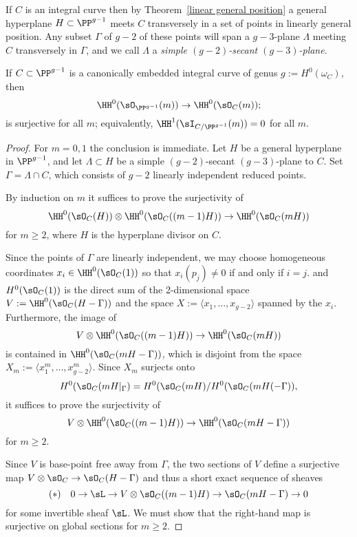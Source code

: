 If $C$ is an integral curve then by Theorem~\ref{linear general position} a general hyperplane $H\subset \PP^{g-1}$
meets $C$ transversely in a set of points in linearly general position. Any subset $\Gamma$ of $g-2$ of these points will span a $g-3$-plane $\Lambda$
meeting $C$ transversely in $\Gamma$, and we call $\Lambda$ a \emph{simple $(g-2)$-secant $(g-3)$-plane}. 

\begin{theorem}\label{canonical curves are ACM}
If $C\subset \PP^{g-1}$ is a  canonically embedded integral curve of genus $g := H^0(\omega_C)$, then 
$$
\HH^{0}(\sO_{\PP^{g-1}}(m)) \to \HH^{0}(\sO_{C}(m));
$$
is  surjective for all $m$; equivalently,
$\HH^{1}(\sI_{C/\PP^{g-1}}(m)) = 0$ for all $m$.
\end{theorem}
  
\begin{proof} 

For $m = 0,1$ the conclusion is immediate. Let $H$ be a general hyperplane in $\PP^{g-1}$, 
and let $\Lambda \subset H$ be a simple $(g-2)$-secant $(g-3)$-plane to $C$. Set $\Gamma = \Lambda \cap C$,
which consists of $g-2$ linearly independent reduced points.

By induction on $m$ it suffices to prove the surjectivity of
$$
\HH^{0}(\sO_{C}(H)) \otimes \HH^{0}(\sO_{C}((m-1)H)) \to \HH^{0}(\sO_{C}(mH))
$$
for $m\geq 2$, where $H$ is the hyperplane divisor on $C$.

Since the points of $\Gamma$
are linearly independent, we may choose homogeneous coordinates $x_{i} \in \HH^{0}(\sO_{C}(1))$ so that
$x_{i}(p_{j}) \neq 0$ if and only if $i = j$. 
and $H^0(\sO_C(1))$ is the direct sum of the 2-dimensional
space $V:= \HH^{0}(\sO_{C}(H-\Gamma))$ and the space $X := \langle x_1,\dots, x_{g-2}\rangle$ spanned by the $x_i$.
Furthermore, the image of 
$$
V \otimes \HH^{0}(\sO_{C}((m-1)H)) \to \HH^{0}(\sO_{C}(mH))
$$
is contained in $\HH^{0}(\sO_{C}(mH-\Gamma))$, which is disjoint from the space
$X_m:= \langle x_1^m,\dots, x_{g-2}^m\rangle$. Since $X_m$ surjects onto
$$
H^0(\sO_C(mH|_\Gamma) = H^0(\sO_C(mH)/H^0(\sO_C(mH(-\Gamma)),
$$
it suffices to prove the surjectivity of
$$
V \otimes \HH^{0}(\sO_{C}((m-1)H)) \to \HH^{0}(\sO_{C}(mH-\Gamma))
$$
for  $m\geq 2$.


Since $V$ is base-point free away from $\Gamma$, the two sections of $V$
define a surjective map $V\otimes \sO_C \to  \sO_{C}(H-\Gamma)$ and thus a short exact sequence of sheaves
$$
(*) \quad 0\to \sL  \to V\otimes \sO_C((m-1)H) \to  \sO_{C}(mH-\Gamma)\to 0
$$
for some invertible sheaf $\sL$. We must show that the right-hand map is surjective on global sections for $m\geq 2$.


\end{proof}
